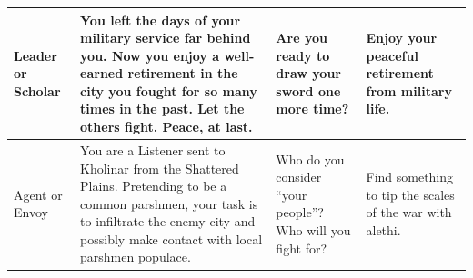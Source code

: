 \begin{table}
\begin{tabular}{p{2.8cm} p{6cm} p{3cm} p{3cm}}
		\color{black} Leader or Scholar & 
		\color{black} You left the days of your military service far behind you. Now you enjoy a well-earned retirement in the city you fought for so many times in the past. Let the others fight. Peace, at last. & 
		\color{black} Are you ready to draw your sword one more time? & 
		\color{black} Enjoy your peaceful retirement from military life.
		\\ 
		\hline
		
		\color{black} Agent or Envoy & 
		\color{black} You are a Listener sent to Kholinar from the Shattered Plains. Pretending to be a common parshmen, your task is to infiltrate the enemy city and possibly make contact with local parshmen populace. & 
		\color{black} Who do you consider “your people”? Who will you fight for? & 
		\color{black} Find something to tip the scales of the war with alethi.
		\\ \hline	
		
	\end{tabular}
\end{table}
\twocolumn